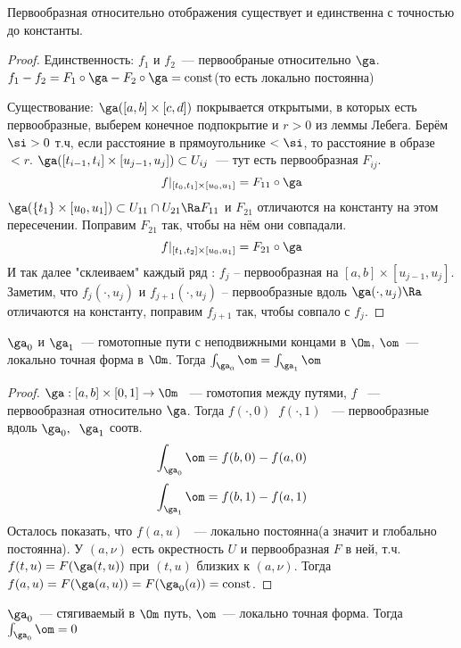 \begin{theorem}
    Первообразная относительно отображения существует и единственна с точностью до константы.
\end{theorem}


\begin{proof} Единственность:
    $f_1$ и $f_2$~--- первообраные относительно $\ga$.
    $f_1-f_2 = F_1\circ \ga - F_2\circ\ga = \mathrm{const}$(то есть локально постоянна)

    Существование:
    $\ga([a, b]\times[c, d])$ покрывается открытыми, в которых есть первообразные, выберем конечное подпокрытие и $r > 0$ из леммы Лебега.
    Берём $\si > 0$ т.ч, если расстояние в прямоугольнике $< \si$, то расстояние в образе $<r$.
    $\ga([t_{i-1}, t_i]\times[u_{j-1}, u_j]) \subset U_{ij}$~--- тут есть первообразная $F_{ij}$.
    \[ f|_{[t_0, t_1]\times[u_0, u_1]}=F_{11}\circ\ga \]
    $\ga(\{t_1\}\times [u_0, u_1]) \subset U_{11}\cap U_{21} \Ra F_{11}$ и $F_{21}$ отличаются на константу на этом пересечении. Поправим $F_{21}$ так, чтобы на нём они совпадали.
    \[ f|_{[t_1, t_2]\times[u_0, u_1]}=F_{21}\circ\ga \]
    И так далее "склеиваем" каждый ряд : $f_j$ -- первообразная на $[a, b] \times [u_{j-1}, u_j]$. Заметим, что $f_j(\cdot, u_j)$ и $f_{j+1}(\cdot, u_{j})$ -- первообразные вдоль $\ga(\cdot, u_j) \Ra$ отличаются на константу, поправим $f_{j+1}$ так, чтобы совпало с $f_j$.
\end{proof}


\begin{theorem}
    $\ga_0$ и $\ga_1$~--- гомотопные пути с неподвижными концами в $\Om$,
    $\om$~--- локально точная форма в $\Om$. Тогда
    $\int_{\ga_0} \om = \int_{\ga_1} \om$
\end{theorem}

\begin{proof}
$\ga : [a, b] \times [0, 1] \to \Om$ ~--- гомотопия между путями, $f$ ~--- первообразная относительно $\ga$. Тогда
$f(\cdot, 0) \; \; f(\cdot, 1)$ ~--- первообразные вдоль $\ga_0, \;\; \ga_1$ соотв.
\[\int_{\ga_0} \om = f(b, 0) - f(a, 0)\]
\[\int_{\ga_1} \om = f(b, 1) - f(a, 1)\]
Осталось показать, что $f(a, u)$ ~--- локально постоянна(а значит и глобально постоянна). У $(a, \nu)$ есть окрестность $U$ и первообразная $F$ в ней, т.ч. $f(t, u) = F(\ga(t, u))$ при $(t, u)$ близких к $(a, \nu)$. Тогда
   $f(a, u) = F(\ga(a, u)) = F(\ga_0(a)) = \mathrm{const}$.
\end{proof}

\begin{theorem}
    $\ga_0$~--- стягиваемый в $\Om$ путь,
    $\om$~--- локально точная форма. Тогда
    $\int_{\ga_0} \om = 0$
\end{theorem}

